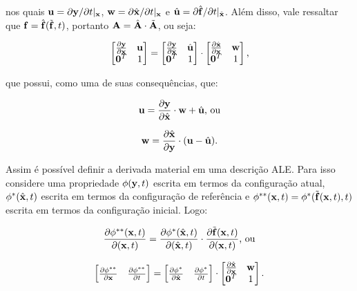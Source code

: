 \documentclass[_ArquivoPrincipal.tex]{subfiles}
\begin{document}
\noindent nos quais $\mathbf{u}=\partial\mathbf{y}/\partial t|_{\mathbf{x}}$, $\mathbf{w}=\partial\hat{\mathbf{x}}/\partial t|_{\mathbf{x}}$ e $\hat{\mathbf{u}}=\partial\hat{\mathbf{f}}/\partial t|_{\hat{\mathbf{x}}}$. Além disso, vale ressaltar que $\mathbf{f}=\hat{\mathbf{f}}(\tilde{\mathbf{f}},t)$, portanto $\mathbf{A}=\hat{\mathbf{A}}\cdot\tilde{\mathbf{A}}$, ou seja:

\begin{equation}
    \begin{bmatrix}\frac{\partial{\mathbf{y}}}{\partial{\mathbf{x}}}&\mathbf{u}\\\mathbf{0}^T&1\end{bmatrix}=
    \begin{bmatrix}\frac{\partial{\mathbf{y}}}{\partial{\hat{\mathbf{x}}}}&\hat{\mathbf{u}}\\\mathbf{0}^T&1\end{bmatrix}\cdot
    \begin{bmatrix}\frac{\partial{\hat{\mathbf{x}}}}{\partial{\mathbf{x}}}&\mathbf{w}\\\mathbf{0}^T&1\end{bmatrix}\text{,}
    \label{F4}
\end{equation}

\noindent que possui, como uma de suas consequências, que:

\begin{equation}
    \mathbf{u}=\frac{\partial{\mathbf{y}}}{\partial{\hat{\mathbf{x}}}}\cdot\mathbf{w}+\hat{\mathbf{u}}\text{, ou}
    \label{u1}
\end{equation}

\begin{equation}
    \mathbf{w}=\frac{\partial{\hat{\mathbf{x}}}}{\partial{\mathbf{y}}}\cdot(\mathbf{u}-\hat{\mathbf{u}})\text{.}
    \label{w1}
\end{equation}

Assim é possível definir a derivada material em uma descrição ALE. Para isso considere uma propriedade $\phi(\mathbf{y},t)$ escrita em termos da configuração atual, $\phi^*(\hat{\mathbf{x}},t)$ escrita em termos da configuração de referência e $\phi^{**}(\mathbf{x},t)=\phi^*(\tilde{\mathbf{f}}(\mathbf{x},t),t)$ escrita em termos da configuração inicial. Logo:

\begin{equation}
    \frac{\partial{\phi^{**}(\mathbf{x},t)}}{\partial{(\mathbf{x},t)}}=\frac{\partial{\phi^*(\hat{\mathbf{x}},t)}}{\partial{(\hat{\mathbf{x}},t)}}\cdot\frac{\partial{\tilde{\mathbf{f}}(\mathbf{x},t)}}{\partial{(\mathbf{x},t)}}\text{, ou}
    \label{phi1}
\end{equation}

\begin{equation}
    \begin{bmatrix}\frac{\partial{\phi^{**}}}{\partial{\mathbf{x}}}&\frac{\partial{\phi^{**}}}{\partial{t}}\end{bmatrix}=
    \begin{bmatrix}\frac{\partial{\phi^{*}}}{\partial{\hat{\mathbf{x}}}}&\frac{\partial{\phi^{*}}}{\partial{t}}\end{bmatrix}\cdot
    \begin{bmatrix}\frac{\partial{\hat{\mathbf{x}}}}{\partial{\mathbf{x}}}&\mathbf{w}\\\mathbf{0}^T&1\end{bmatrix}
    \text{.}
    \label{phi2}
\end{equation}
\end{document}
